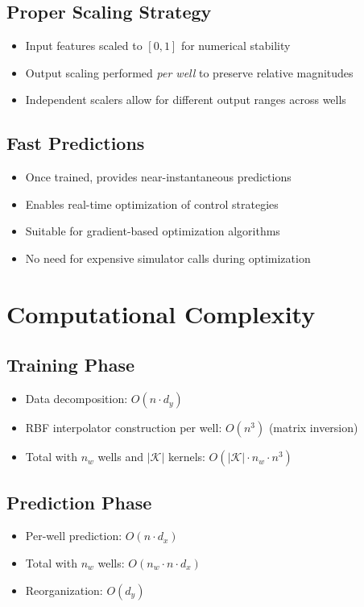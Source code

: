 \documentclass[11pt]{article}
\begin{document}
\subsection{Proper Scaling Strategy}
\begin{itemize}
    \item Input features scaled to $[0,1]$ for numerical stability
    \item Output scaling performed \textit{per well} to preserve relative magnitudes
    \item Independent scalers allow for different output ranges across wells
\end{itemize}

\subsection{Fast Predictions}
\begin{itemize}
    \item Once trained, provides near-instantaneous predictions
    \item Enables real-time optimization of control strategies
    \item Suitable for gradient-based optimization algorithms
    \item No need for expensive simulator calls during optimization
\end{itemize}

\section{Computational Complexity}

\subsection{Training Phase}
\begin{itemize}
    \item Data decomposition: $O(n \cdot d_y)$
    \item RBF interpolator construction per well: $O(n^3)$ (matrix inversion)
    \item Total with $n_w$ wells and $|\mathcal{K}|$ kernels: $O(|\mathcal{K}| \cdot n_w \cdot n^3)$
\end{itemize}

\subsection{Prediction Phase}
\begin{itemize}
    \item Per-well prediction: $O(n \cdot d_x)$ 
    \item Total with $n_w$ wells: $O(n_w \cdot n \cdot d_x)$
    \item Reorganization: $O(d_y)$
\end{itemize}
\end{document}
